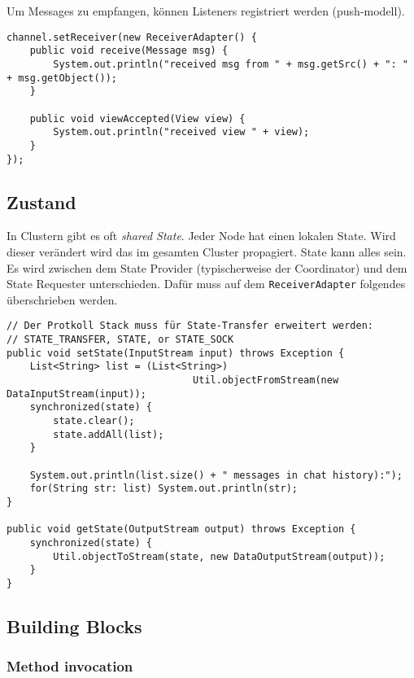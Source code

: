 Um Messages zu empfangen, können Listeners registriert werden (push-modell).

\begin{lstlisting}[caption=Message Listener]
channel.setReceiver(new ReceiverAdapter() {
	public void receive(Message msg) {
		System.out.println("received msg from " + msg.getSrc() + ": " + msg.getObject());
	}

	public void viewAccepted(View view) {
		System.out.println("received view " + view);
	}
});
\end{lstlisting}
	
\subsection{Zustand}

In Clustern gibt es oft \emph{shared State}. Jeder Node hat einen lokalen State. Wird dieser verändert wird das im gesamten Cluster propagiert. State kann alles sein. Es wird zwischen dem State Provider (typischerweise der Coordinator) und dem State Requester unterschieden. Dafür muss auf dem \verb|ReceiverAdapter| folgendes überschrieben werden. 

\begin{lstlisting}[caption=\texttt{ReceiverAdapter} überschreiben]
// Der Protkoll Stack muss für State-Transfer erweitert werden: 
// STATE_TRANSFER, STATE, or STATE_SOCK
public void setState(InputStream input) throws Exception {
    List<String> list = (List<String>)
							    Util.objectFromStream(new DataInputStream(input));
	synchronized(state) {
		state.clear();
		state.addAll(list);
	}
	
	System.out.println(list.size() + " messages in chat history):");
	for(String str: list) System.out.println(str);
}

public void getState(OutputStream output) throws Exception {
	synchronized(state) {
		Util.objectToStream(state, new DataOutputStream(output));
	}
}

\end{lstlisting}

\subsection{Building Blocks}

\subsubsection{Method invocation}


